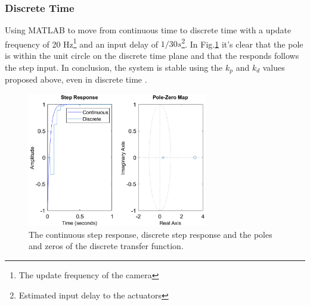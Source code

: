 \subsubsection{Discrete Time}
Using MATLAB to move from continuous time to discrete time with a update frequency of 20 Hz\footnote{The update frequency of the camera} and an input delay of $1/30s$\footnote{Estimated input delay to the actuators}. In Fig.\ref{fig:stepD} it's clear that the pole is within the unit circle on the discrete time plane and that the responds follows the step input. In conclusion, the system is stable using the $k_p$ and $k_d$ values proposed above, even in discrete time \cite{torkel_ljung}.

\begin{figure}[H]
    \centering
    \includegraphics[width= 0.7\textwidth]{img/closed_loop_step_D.eps}
    \caption{The continuous step response, discrete step response and the poles and zeros of the discrete transfer function.}
    \label{fig:stepD}
\end{figure}
